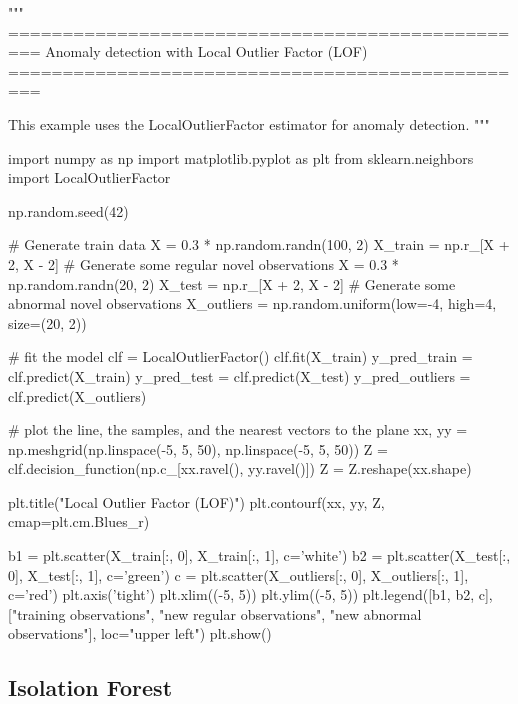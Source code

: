 \begin{pythoncode} 
"""
=================================================
Anomaly detection with Local Outlier Factor (LOF)
=================================================

This example uses the LocalOutlierFactor estimator
for anomaly detection.
"""

import numpy as np
import matplotlib.pyplot as plt
from sklearn.neighbors import LocalOutlierFactor

np.random.seed(42)

# Generate train data
X = 0.3 * np.random.randn(100, 2)
X_train = np.r_[X + 2, X - 2]
# Generate some regular novel observations
X = 0.3 * np.random.randn(20, 2)
X_test = np.r_[X + 2, X - 2]
# Generate some abnormal novel observations
X_outliers = np.random.uniform(low=-4, high=4, size=(20, 2))

# fit the model
clf = LocalOutlierFactor()
clf.fit(X_train)
y_pred_train = clf.predict(X_train)
y_pred_test = clf.predict(X_test)
y_pred_outliers = clf.predict(X_outliers)

# plot the line, the samples, and the nearest vectors to the plane
xx, yy = np.meshgrid(np.linspace(-5, 5, 50), np.linspace(-5, 5, 50))
Z = clf.decision_function(np.c_[xx.ravel(), yy.ravel()])
Z = Z.reshape(xx.shape)

plt.title("Local Outlier Factor (LOF)")
plt.contourf(xx, yy, Z, cmap=plt.cm.Blues_r)

b1 = plt.scatter(X_train[:, 0], X_train[:, 1], c='white')
b2 = plt.scatter(X_test[:, 0], X_test[:, 1], c='green')
c = plt.scatter(X_outliers[:, 0], X_outliers[:, 1], c='red')
plt.axis('tight')
plt.xlim((-5, 5))
plt.ylim((-5, 5))
plt.legend([b1, b2, c],
           ["training observations",
            "new regular observations", "new abnormal observations"],
           loc="upper left")
plt.show()
\end{pythoncode}




\subsection{Isolation Forest}
\label{sec:iforest}


